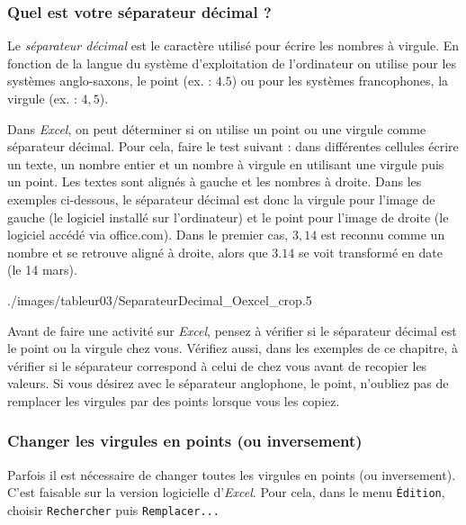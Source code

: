 \subsubsection{Quel est votre séparateur décimal ?}


Le \emph{séparateur décimal} est le caractère utilisé pour écrire les nombres à virgule. En fonction de la langue du système d'exploitation de l'ordinateur on utilise pour les systèmes anglo-saxons, le point (ex. : $4.5$) ou pour les systèmes francophones, la virgule (ex. : $4,5$).

\vspace{6pt}

Dans \emph{Excel}, on peut déterminer si on utilise un point ou une virgule comme séparateur décimal. Pour cela, faire le test suivant : dans différentes cellules écrire un texte, un nombre entier et un nombre à virgule en utilisant une virgule puis un point. Les textes sont alignés à gauche et les nombres à droite. Dans les exemples ci-dessous, le séparateur décimal est donc la virgule pour l'image de gauche (le logiciel installé sur l'ordinateur) et le point pour l'image de droite (le logiciel accédé via office.com). Dans le premier cas, $3,14$ est reconnu comme un nombre et se retrouve aligné à droite, alors que $3.14$ se voit transformé en date (le 14 mars).

%  
{./images/tableur03/SeparateurDecimal_Oexcel_crop}{.5\textwidth}

Avant de faire une activité sur \emph{Excel}, pensez à vérifier si le séparateur décimal est le point ou la virgule chez vous. Vérifiez aussi, dans les exemples de ce chapitre, à vérifier si le séparateur correspond à celui de chez vous avant de recopier les valeurs. Si vous désirez avec le séparateur anglophone, le point, n'oubliez pas de remplacer les virgules par des points lorsque vous les copiez.

\subsubsection{Changer les virgules en points (ou inversement)}

Parfois il est nécessaire de changer toutes les virgules en points (ou inversement). C'est faisable sur la version logicielle d'\emph{Excel}. Pour cela, dans le menu \texttt{Édition}, choisir \texttt{Rechercher} puis \texttt{Remplacer...}


